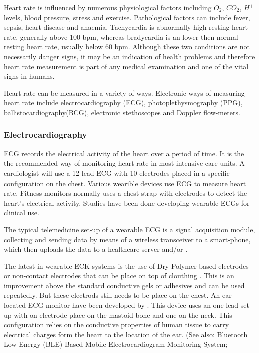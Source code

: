 Heart rate is influenced by numerous physiological factors including $O_2$, $CO_2$, $H^+$ levels, blood pressure, stress and exercise. Pathological factors can include fever, sepsis, heart disease and anaemia. Tachycardia is abnormally high resting heart rate, generally above 100 bpm, whereas bradycardia is an lower then normal resting heart rate, usually below 60 bpm. Although these two conditions are not necessarily danger signs, it may be an indication of health problems and therefore heart rate measurement is part of any medical examination and one of the vital signs in humans.

Heart rate can be measured in a variety of ways. Electronic ways of measuring heart rate include electrocardiography (ECG), photoplethysmography (PPG), ballistocardiography(BCG), electronic stethoscopes and Doppler flow-meters.

\subsubsection{Electrocardiography}
ECG records the electrical activity of the heart over a period of time. It is the the recommended way of monitoring heart rate in most intensive care units. A cardiologist will use a 12 lead ECG with 10 electrodes placed in a specific configuration on the chest. Various wearible devices use ECG to measure heart rate. Fitness monitors normally uses a chest strap with electrodes to detect the heart's electrical activity. Studies have been done developing wearable ECGs for clinical use.

The typical telemedicine set-up of a wearable ECG is a signal acquisition module, collecting and sending data by means of a wireless transceiver to a smart-phone, which then uploads the data to a healthcare server \citep{wang2010wearable} and/or \citep{prawiro2016integrated}. %

The latest in wearable ECK systems is the use of Dry Polymer-based electrodes \citep{wang2010wearable} or non-contact electrodes that can be place on top of clouthing \citep{lin2013development}. This is an improvement above the standard conductive gels or adhesives and can be used repeatedly. But these electrods still needs to be place on the chest. An ear located ECG monitor have been developed by \cite{winokur2012wearable}. This device uses an one lead set-up with on electrode place on the mastoid bone and one on the neck. This configuration relies on the conductive properties of human tissue to carry electrical charges form the heart to the location of the ear. (See also: Bluetooth Low Energy (BLE) Based Mobile Electrocardiogram Monitoring System; 

